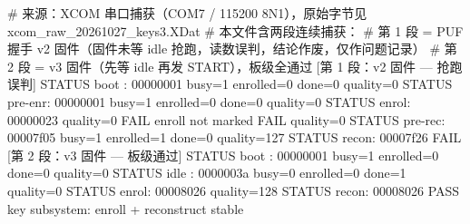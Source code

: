 \begin{codeblock}
# 来源：XCOM 串口捕获（COM7 / 115200 8N1），原始字节见 xcom_raw_20261027_keys3.XDat
# 本文件含两段连续捕获：
#   第 1 段 = PUF 握手 v2 固件（固件未等 idle 抢跑，读数误判，结论作废，仅作问题记录）
#   第 2 段 = v3 固件（先等 idle 再发 START），板级全通过
[第 1 段：v2 固件 — 抢跑误判]
STATUS boot   : 00000001 busy=1 enrolled=0 done=0 quality=0
STATUS pre-enr: 00000001 busy=1 enrolled=0 done=0 quality=0
STATUS enrol: 00000023 quality=0
FAIL enroll not marked
FAIL quality=0
STATUS pre-rec: 00007f05 busy=1 enrolled=1 done=0 quality=127
STATUS recon: 00007f26
FAIL
[第 2 段：v3 固件 — 板级通过]
STATUS boot   : 00000001 busy=1 enrolled=0 done=0 quality=0
STATUS idle   : 0000003a busy=0 enrolled=0 done=1 quality=0
STATUS enrol: 00008026 quality=128
STATUS recon: 00008026
PASS key subsystem: enroll + reconstruct stable
\end{codeblock}
